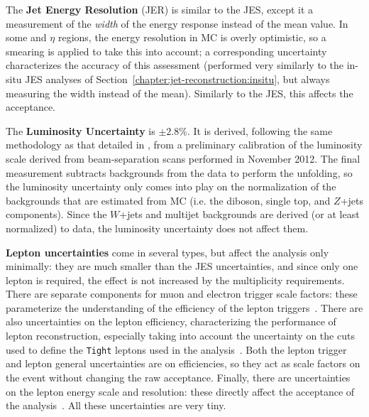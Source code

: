 	The \textbf{Jet Energy Resolution} (JER) is similar to the JES, except it a measurement of the \textit{width} of the energy response instead of the mean value. In some \pt and $\eta$ regions, the energy resolution in MC is overly optimistic, so a smearing is applied to take this into account; a corresponding uncertainty characterizes the accuracy of this assessment (performed very similarly to the in-situ JES analyses of Section~\ref{chapter:jet-reconstruction:insitu}, but always measuring the width instead of the mean). Similarly to the JES, this affects the acceptance.%


	The \textbf{Luminosity Uncertainty} is $\pm2.8\%$. It is derived, following the same methodology as that detailed in \cite{ATLASLumi}, from a preliminary calibration of the luminosity scale derived from beam-separation scans performed in November 2012. The final measurement subtracts backgrounds from the data to perform the unfolding, so the luminosity uncertainty only comes into play on the normalization of the backgrounds that are estimated from MC (i.e. the diboson, single top, and $Z$+jets components). Since the $W$+jets and multijet backgrounds are derived (or at least normalized) to data, the luminosity uncertainty does not affect them.

	\textbf{Lepton uncertainties} come in several types, but affect the analysis only minimally: they are much smaller than the JES uncertainties, and since only one lepton is required, the effect is not increased by the multiplicity requirements. There are separate components for muon and electron trigger scale factors: these parameterize the understanding of the efficiency of the lepton triggers~\cite{Pasztor:1706278,ATLAS-CONF-2012-099}. There are also uncertainties on the lepton efficiency, characterizing the performance of lepton reconstruction, especially taking into account the uncertainty on the cuts used to define the \texttt{Tight} leptons used in the analysis~\cite{Aad:2014fxa,ATLAS-CONF-2014-032,Aad:2014rra}. Both the lepton trigger and lepton general uncertainties are on efficiencies, so they act as scale factors on the event without changing the raw acceptance. Finally, there are uncertainties on the lepton energy scale and resolution: these directly affect the acceptance of the analysis~\cite{Aad:2014nim,Aad:2014rra}. All these uncertainties are very tiny.

